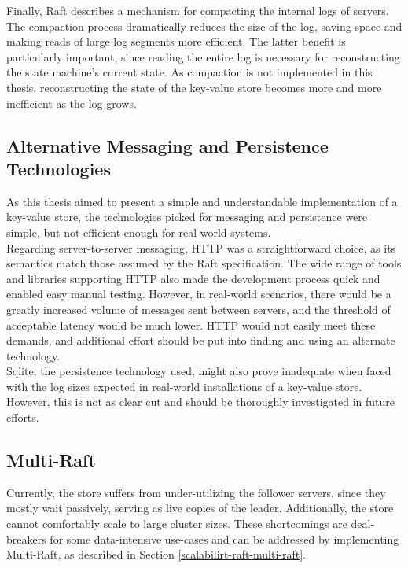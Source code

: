 Finally, Raft describes a mechanism for compacting the internal logs of servers. The compaction process dramatically reduces the size of the log, saving space and making reads of large log segments more efficient. The latter benefit is particularly important, since reading the entire log is necessary for reconstructing the state machine's current state. As compaction is not implemented in this thesis, reconstructing the state of the key-value store becomes more and more inefficient as the log grows.

\subsection{Alternative Messaging and Persistence Technologies}

As this thesis aimed to present a simple and understandable implementation of a key-value store, the technologies picked for messaging and persistence were simple, but not efficient enough for real-world systems.\\

Regarding server-to-server messaging, HTTP was a straightforward choice, as its semantics match those assumed by the Raft specification. The wide range of tools and libraries supporting HTTP also made the development process quick and enabled easy manual testing. However, in real-world scenarios, there would be a greatly increased volume of messages sent between servers, and the threshold of acceptable latency would be much lower. HTTP would not easily meet these demands, and additional effort should be put into finding and using an alternate technology.\\

Sqlite, the persistence technology used, might also prove inadequate when faced with the log sizes expected in real-world installations of a key-value store. However, this is not as clear cut and should be thoroughly investigated in future efforts.

\subsection{Multi-Raft}

Currently, the store suffers from under-utilizing the follower servers, since they mostly wait passively, serving as live copies of the leader. Additionally, the store cannot comfortably scale to large cluster sizes. These shortcomings are deal-breakers for some data-intensive use-cases and can be addressed by implementing Multi-Raft, as described in Section \ref{scalabilirt-raft-multi-raft}.

